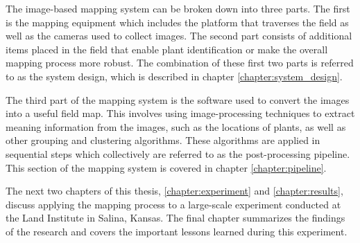 The image-based mapping system can be broken down into three parts.  The first is the mapping equipment which includes the platform that traverses the field as well as the cameras used to collect images.  The second part consists of additional items placed in the field that enable plant identification or make the overall mapping process more robust.  The combination of these first two parts is referred to as the system design, which is described in chapter \ref{chapter:system_design}. 

The third part of the mapping system is the software used to convert the images into a useful field map.  This involves using image-processing techniques to extract meaning information from the images, such as the locations of plants, as well as other grouping and clustering algorithms.  These algorithms are applied in sequential steps which collectively are referred to as the post-processing pipeline.  This section of the mapping system is covered in chapter \ref{chapter:pipeline}. 

The next two chapters of this thesis, \ref{chapter:experiment} and \ref{chapter:results}, discuss applying the mapping process to a large-scale experiment conducted at the Land Institute in Salina, Kansas.  The final chapter summarizes the findings of the research and covers the important lessons learned during this experiment.
